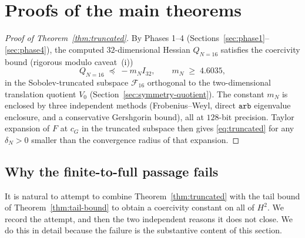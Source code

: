 \documentclass[11pt]{amsart}
\theoremstyle{plain}
\theoremstyle{definition}
\newcommand{\cG}{c_{G}}
\begin{document}


\section{Proofs of the main theorems}\label{sec:main-proof}

\begin{proof}[Proof of Theorem~\ref{thm:truncated}]
By Phases 1--4 (Sections~\ref{sec:phase1}--\ref{sec:phase4}), the
computed $32$-dimensional Hessian $Q_{N=16}$ satisfies the coercivity
bound (rigorous modulo caveat~(i))
\begin{equation}\label{eq:Truncated-coercivity}
  Q_{N=16} \;\preceq\; -m_{N} I_{32}, \qquad m_{N} \;\geq\; 4.6035,
\end{equation}
in the Sobolev-truncated subspace $\mathcal{F}_{16}$ orthogonal to the
two-dimensional translation quotient $V_{0}$
(Section~\ref{sec:symmetry-quotient}).  The constant $m_{N}$ is
enclosed by three independent methods (Frobenius--Weyl, direct
$\texttt{arb}$ eigenvalue enclosure, and a conservative Gershgorin
bound), all at $128$-bit precision.  Taylor expansion of $F$ at
$\cG$ in the truncated subspace then gives \eqref{eq:truncated} for
any $\delta_{N} > 0$ smaller than the convergence radius of that
expansion.
\end{proof}

\subsection{Why the finite-to-full passage fails}
\label{sec:passage-fails}

It is natural to attempt to combine Theorem~\ref{thm:truncated} with
the tail bound of Theorem~\ref{thm:tail-bound} to obtain a coercivity
constant on all of $H^{2}$.  We record the attempt, and then the two
independent reasons it does not close.  We do this in detail because
the failure is the substantive content of this section.
\end{document}
